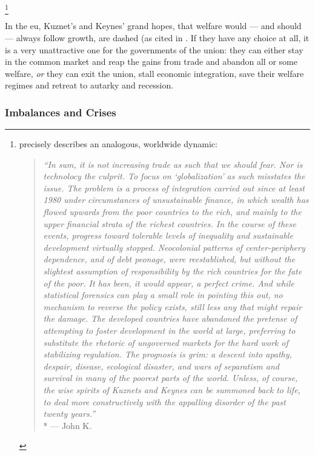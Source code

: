 \footnote{
	\citeauthor[25]{Galbraith2002a} precisely describes an analogous, worldwide dynamic:

	\begin{quote}
		\emph{``In sum, it is not increasing trade \emph{as such} that we should fear.
		Nor is technolocy the culprit.
		To focus on `globalization' as such misstates the issue.
		The problem is a process of integration carried out since at least 1980 under circumstances of unsustainable finance, in which wealth has flowed upwards from the poor countries to the rich, and mainly to the upper financial strata of the richest countries.
		In the course of these events, progress toward tolerable levels of inequality and sustainable development virtually stopped.
		Neocolonial patterns of center-periphery dependence, and of debt peonage, were reestablished, but without the slightest assumption of responsibility by the rich countries for the fate of the poor.
		It has been, it would appear, a perfect crime.
		And while statistical forensics can play a small role in pointing this out, no mechanism to reverse the policy exists, still less any that might repair the damage.
		The developed countries have abandoned the pretense of attempting to foster development in the world at large, preferring to substitute the rhetoric of ungoverned markets for the hard work of stabilizing regulation.
		The prognosis is grim:
		a descent into apathy, despair, disease, ecological disaster, and wars of separatism and survival in many of the poorest parts of the world.
		Unless, of course, the wise spirits of Kuznets and Keynes can be summoned back to life, to deal more constructively with the appalling disorder of the past twenty years.''}
		\\*
		--- John K.\ \citet[25]{Galbraith2002a}
	\end{quote}
}

In the \gls{eu}, Kuznet's and Keynes' grand hopes, that welfare would --- and should --- always follow growth, are dashed (as cited in \cite[22]{Galbraith2002a}.
If they have any choice at all, it is a very unattractive one for the governments of the union:
they can either stay in the common market and reap the gains from trade and abandon all or some welfare, \emph{or} they can exit the union, stall economic integration, save their welfare regimes and retreat to autarky and recession.

\subsubsection{Imbalances and Crises}
	\label{sec:imbalances}

